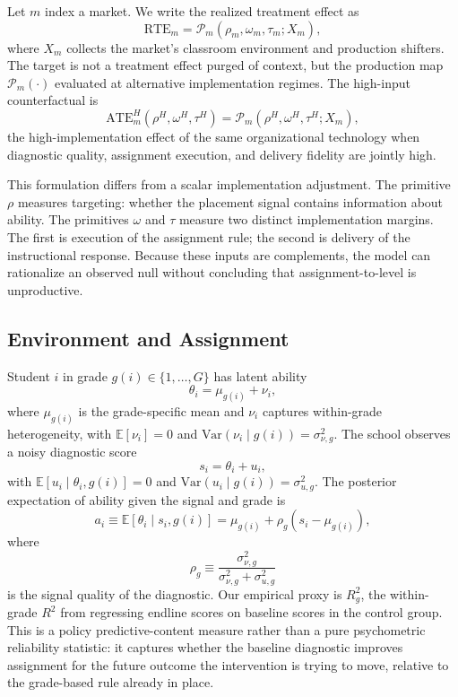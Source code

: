 \documentclass[11pt]{article}
\newcommand{\E}{\mathbb{E}}
\begin{document}
Let $m$ index a market. We write the realized treatment effect as
\begin{equation}
\label{eq:rte_map}
\mathrm{RTE}_m = \mathcal{P}_m(\rho_m,\omega_m,\tau_m;X_m),
\end{equation}
where $X_m$ collects the market's classroom environment and production shifters. The target is not a treatment effect purged of context, but the production map $\mathcal{P}_m(\cdot)$ evaluated at alternative implementation regimes. The high-input counterfactual is
\begin{equation}
\label{eq:latent_high_input}
\mathrm{ATE}_{m}^{H}(\rho^H,\omega^H,\tau^H)
= \mathcal{P}_m(\rho^H,\omega^H,\tau^H;X_m),
\end{equation}
the high-implementation effect of the same organizational technology when diagnostic quality, assignment execution, and delivery fidelity are jointly high.

This formulation differs from a scalar implementation adjustment. The primitive $\rho$ measures targeting: whether the placement signal contains information about ability. The primitives $\omega$ and $\tau$ measure two distinct implementation margins. The first is execution of the assignment rule; the second is delivery of the instructional response. Because these inputs are complements, the model can rationalize an observed null without concluding that assignment-to-level is unproductive.

\subsection{Environment and Assignment}

Student $i$ in grade $g(i) \in \{1, \ldots, G\}$ has latent ability
\begin{equation}
\label{eq:ability}
\theta_i = \mu_{g(i)} + \nu_i,
\end{equation}
where $\mu_{g(i)}$ is the grade-specific mean and $\nu_i$ captures within-grade heterogeneity, with $\E[\nu_i] = 0$ and $\text{Var}(\nu_i \mid g(i)) = \sigma^2_{\nu,g}$. The school observes a noisy diagnostic score
\begin{equation}
\label{eq:score}
s_i = \theta_i + u_i,
\end{equation}
with $\E[u_i \mid \theta_i, g(i)] = 0$ and $\text{Var}(u_i \mid g(i)) = \sigma^2_{u,g}$. The posterior expectation of ability given the signal and grade is
\begin{equation}
\label{eq:posterior}
a_i \equiv \E[\theta_i \mid s_i, g(i)] = \mu_{g(i)} + \rho_g(s_i - \mu_{g(i)}),
\end{equation}
where
\begin{equation}
\label{eq:signal_quality}
\rho_g \equiv \frac{\sigma^2_{\nu,g}}{\sigma^2_{\nu,g} + \sigma^2_{u,g}}
\end{equation}
is the signal quality of the diagnostic. Our empirical proxy is $R^2_g$, the within-grade $R^2$ from regressing endline scores on baseline scores in the control group. This is a policy predictive-content measure rather than a pure psychometric reliability statistic: it captures whether the baseline diagnostic improves assignment for the future outcome the intervention is trying to move, relative to the grade-based rule already in place.
\end{document}
